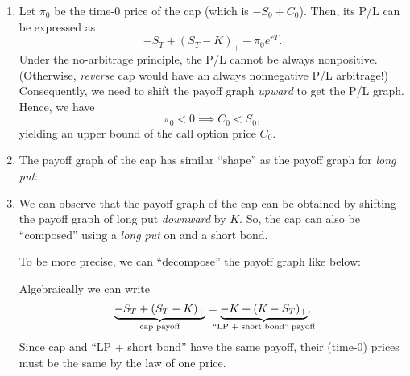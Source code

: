 \begin{enumerate}
\item \label{it:call-price-ub}
Let \(\pi_0\) be the time-0 price of the cap (which is \(-S_0+C_0\)). Then,
its P/L can be expressed as
\[
-S_T+(S_T-K)_{+}-\pi_0e^{rT}.
\]
Under the no-arbitrage principle, the P/L cannot be always nonpositive.
(Otherwise, \emph{reverse} cap would have an always nonnegative P/L
 arbitrage!) Consequently, we need to shift the payoff
graph \emph{upward} to get the P/L graph. Hence, we have
\[
\pi_0<0\implies C_0<S_0,
\]
yielding an upper bound of the call option price \(C_0\).

\item The payoff graph of the cap has similar ``shape'' as the payoff graph for \emph{long
put}:
\begin{center}
\end{center}

\item We can observe that the payoff graph of the cap can be obtained by
shifting the payoff graph of long put \emph{downward} by \(K\). So, the cap can
also be ``composed'' using a \emph{long put} on  and a short
bond.

To be more precise, we can ``decompose'' the payoff graph like below:
\begin{center}
\end{center}
Algebraically we can write
\[
\underbrace{-S_T+(S_T-K)_{+}}_{\text{cap payoff}}
=\underbrace{-K+(K-S_T)_{+}}_{\mathclap{\text{``LP + short bond'' payoff}}},
\]
Since cap and ``LP + short bond'' have the same payoff, their (time-0) prices
must be the same by the law of one price.
\end{enumerate}
